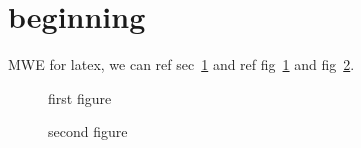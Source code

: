 \documentclass{article}
\begin{document}
\section{beginning} \label{sec:beginning}
MWE for latex, we can ref sec~\ref{sec:beginning} and ref fig~\ref{fig:fig1} and fig~\ref{fig:fig2}.

\begin{figure}
  \centering
  \caption{\label{fig:fig1}
      first figure
  }
\end{figure}
\begin{figure}
  \centering
  \caption{\label{fig:fig2}
      second figure
  }
\end{figure}
\end{document}
